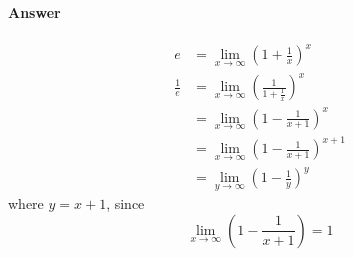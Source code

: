 \paragraph{Answer}
\begin{align*}
    e &= \lim_{x \rightarrow \infty} \left( 1 + \frac{1}{x} \right)^x \\
    \frac{1}{e}
        &= \lim_{x \rightarrow \infty} \left( \frac{1}{1 + \frac{1}{x}}
            \right)^x \\
        &= \lim_{x \rightarrow \infty} \left( 1 - \frac{1}{x + 1} \right)^x \\
        &= \lim_{x \rightarrow \infty} \left( 1 - \frac{1}{x + 1}
            \right)^{x + 1} \\
        &= \lim_{y \rightarrow \infty} \left( 1 - \frac{1}{y} \right)^y
\end{align*}
where $ y = x + 1 $, since
\begin{equation*}
    \lim_{x \rightarrow \infty} \left( 1 - \frac{1}{x + 1} \right) = 1
\end{equation*}

